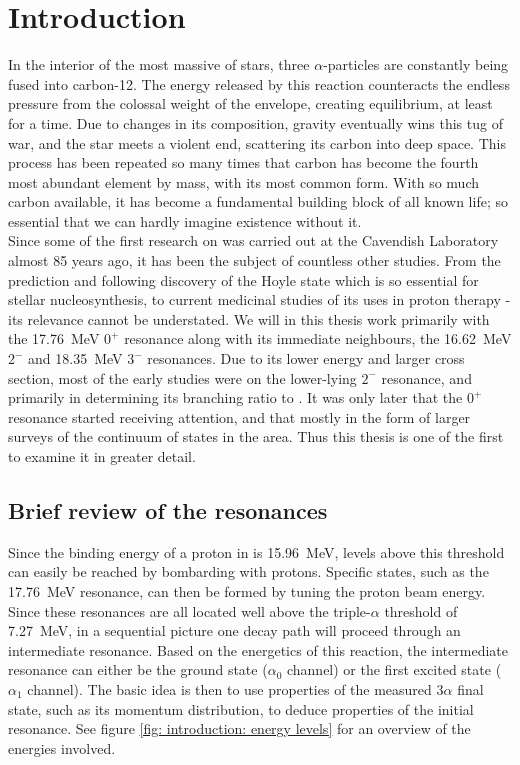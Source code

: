 \section{Introduction}
In the interior of the most massive of stars, three $\alpha$-particles are constantly being fused into carbon-12. The energy released by this reaction counteracts the endless pressure from the colossal weight of the envelope, creating equilibrium, at least for a time. Due to changes in its composition, gravity eventually wins this tug of war, and the star meets a violent end, scattering its carbon into deep space. This process has been repeated so many times that carbon has become the fourth most abundant element by mass, with  its most common form. With so much carbon available, it has become a fundamental building block of all known life; so essential that we can hardly imagine existence without it. \\

Since some of the first research on  was carried out at the Cavendish Laboratory \cite{Oliphant}\cite{Gilbert} almost 85 years ago, it has been the subject of countless other studies. From the prediction and following discovery of the Hoyle state \cite{Hoyle}\cite{Dunbar} which is so essential for stellar nucleosynthesis, to current medicinal studies of its uses in proton therapy \cite{Cirrone} - its relevance cannot be understated. We will in this thesis work primarily with the \SI{17.76}{MeV} $0^+$ resonance along with its immediate neighbours, the \SI{16.62}{MeV} $2^-$ and \SI{18.35}{MeV} $3^-$ resonances. Due to its lower energy and larger cross section, most of the early studies were on the lower-lying $2^-$ resonance, and primarily in determining its branching ratio to . It was only later that the $0^+$ resonance started receiving attention, and that mostly in the form of larger surveys of the continuum of states in the area. Thus this thesis is one of the first to examine it in greater detail.

\subsection{Brief review of the resonances}
Since the binding energy of a proton in  is \SI{15.96}{MeV}, levels above this threshold can easily be reached by bombarding  with protons. Specific states, such as the \SI{17.76}{MeV} resonance, can then be formed by tuning the proton beam energy. Since these resonances are all located well above the triple-$\alpha$ threshold of \SI{7.27}{MeV}, in a sequential picture one decay path will proceed through an intermediate  resonance. Based on the energetics of this reaction, the intermediate resonance can either be the ground state  ($\alpha_0$ channel) or the first excited state  ($\alpha_1$ channel). The basic idea is then to use properties of the measured $3\alpha$ final state, such as its momentum distribution, to deduce properties of the initial  resonance. See figure \ref{fig: introduction: energy levels} for an overview of the energies involved. \\

